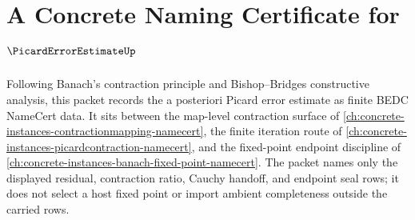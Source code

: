 \chapter{A Concrete Naming Certificate for $\PicardErrorEstimateUp$}
\label{ch:concrete-instances-picard-error-estimate-namecert}

Following Banach's contraction principle and Bishop--Bridges constructive analysis, this packet records the a posteriori Picard error estimate as finite BEDC NameCert data. It sits between the map-level contraction surface of \autoref{ch:concrete-instances-contractionmapping-namecert}, the finite iteration route of \autoref{ch:concrete-instances-picardcontraction-namecert}, and the fixed-point endpoint discipline of \autoref{ch:concrete-instances-banach-fixed-point-namecert}. The packet names only the displayed residual, contraction ratio, Cauchy handoff, and endpoint seal rows; it does not select a host fixed point or import ambient completeness outside the carried rows.

